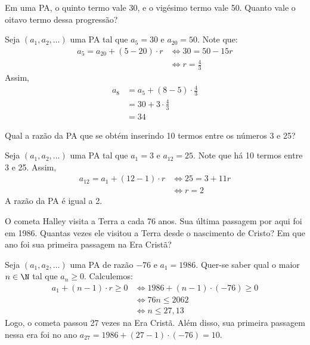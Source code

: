 \begin{example}
Em uma PA, o quinto termo vale 30, e o vigésimo termo vale 50. Quanto vale o oitavo termo dessa progressão?
\end{example}

\begin{solution}
Seja $(a_1, a_2, \dots)$ uma PA tal que $a_5 = 30$ e $a_{20}=50$. Note que:
%
\begin{align*}
a_5 = a_{20}+(5-20)\cdot r & \iff 30 = 50-15r\\
& \iff r = \frac 4 3
\end{align*}
%
Assim,
%
\begin{align*}
a_8 & = a_5+(8-5) \cdot \frac 4 3 \\
& = 30 + 3 \cdot \frac 4 3 \\
& =  34
\end{align*}
\end{solution}

\begin{example}
Qual a razão da PA que se obtém inserindo 10 termos entre os números 3 e 25?
\end{example}

\begin{solution}
Seja $(a_1, a_2, \dots)$ uma PA tal que $a_1 = 3$ e $a_{12} = 25$. Note que há 10 termos entre 3 e 25. Assim,
%
\begin{align*}
a_{12} = a_1 + (12-1)\cdot r & \iff 25 = 3 + 11r\\
& \iff r = 2
\end{align*}
%
A razão da PA é igual a 2.
\end{solution}

\begin{example}
O cometa Halley visita a Terra a cada 76 anos. Sua última passagem por aqui foi em 1986. Quantas vezes ele visitou a Terra desde o nascimento de Cristo? Em que ano foi sua primeira passagem na Era Cristã?
\end{example}

\begin{solution}
Seja $(a_1, a_2, \dots)$ uma PA de razão $-76$ e $a_1 = 1986$. Quer-se saber qual o maior $n \in \N$ tal que $a_n \ge 0$. Calculemos:
%
\begin{align*}
a_1+(n-1)\cdot r\ge 0 & \iff 1986+(n-1)\cdot(-76)\ge 0 \\
& \iff 76n \le 2062 \\
& \iff n \le 27{,}13
\end{align*}
%
Logo, o cometa passou 27 vezes na Era Cristã. Além disso, sua primeira passagem nessa era foi no ano $a_{27}=1986+(27-1)\cdot(-76)=10$.
\end{solution}

